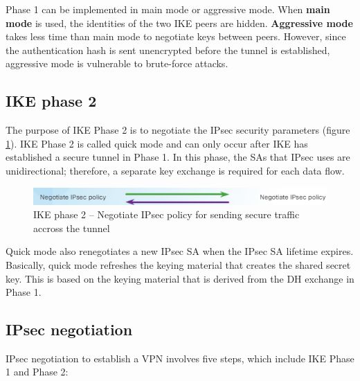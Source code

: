 Phase 1 can be implemented in main mode or aggressive mode. When \textbf{main mode} is used, the identities of the two IKE peers are hidden. \textbf{Aggressive mode} takes less time than main mode to negotiate keys between peers. However, since the authentication hash is sent unencrypted before the tunnel is established, aggressive mode is vulnerable to brute-force attacks.

\subsection{IKE phase 2}

The purpose of IKE Phase 2 is to negotiate the IPsec security parameters (figure \ref{IKEphase2}). IKE Phase 2 is called quick mode and can only occur after IKE has established a secure tunnel in Phase 1.  In this phase, the SAs that IPsec uses are unidirectional; therefore, a separate key exchange is required for each data flow.

\begin{figure}[hbtp]
\caption{IKE phase 2 -- Negotiate IPsec policy for sending secure traffic accross the tunnel}\label{IKEphase2}
\centering
\includegraphics[scale=1]{pictures/IKEphase2.PNG}
\end{figure}

Quick mode also renegotiates a new IPsec SA when the IPsec SA lifetime expires. Basically, quick mode refreshes the keying material that creates the shared secret key. This is based on the keying material that is derived from the DH exchange in Phase 1.

\subsection{IPsec negotiation}
IPsec negotiation to establish a VPN involves five steps, which include IKE Phase 1 and Phase 2:

